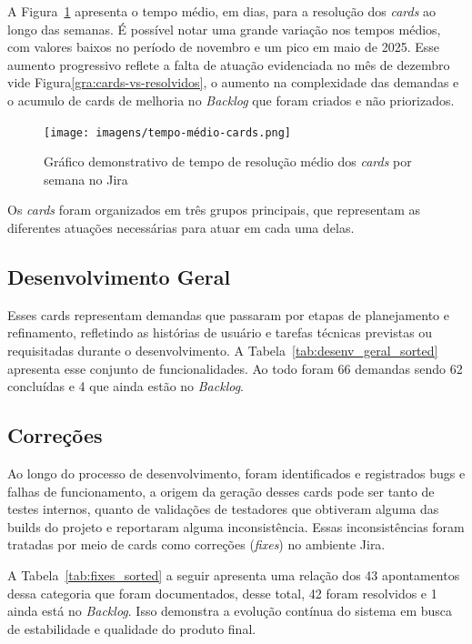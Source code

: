 A Figura~\ref{gra:tempo-medio-resolucao} apresenta o tempo médio, em dias, 
para a resolução dos \textit{cards} ao longo das semanas. É possível notar uma grande variação 
nos tempos médios, com valores baixos no período de novembro e um pico em maio de 2025. 
Esse aumento progressivo reflete a falta de atuação evidenciada no mês de dezembro vide 
Figura\ref{gra:cards-vs-resolvidos}, o aumento na complexidade das demandas e o acumulo de 
cards de melhoria no \textit{Backlog} que foram criados e não priorizados.

\begin{figure}[H]
    \centering
    \texttt{[image: imagens/tempo-médio-cards.png]}
    \caption{Gráfico demonstrativo de tempo de resolução médio dos \textit{cards} por semana no Jira}
    \label{gra:tempo-medio-resolucao}
\end{figure}

Os \textit{cards} foram organizados em três grupos principais, que representam as diferentes
atuações necessárias para atuar em cada uma delas.
\subsection{Desenvolvimento Geral}
Esses cards representam demandas que passaram por etapas de planejamento e refinamento, 
refletindo as histórias de usuário e tarefas técnicas previstas ou requisitadas durante o desenvolvimento.
A Tabela~\ref{tab:desenv_geral_sorted} apresenta esse conjunto de funcionalidades. Ao todo foram 66 demandas
sendo 62 concluídas e 4 que ainda estão no \textit{Backlog}.



\subsection{Correções}
Ao longo do processo de desenvolvimento, foram identificados e registrados bugs e falhas 
de funcionamento, a origem da geração desses cards pode ser tanto de testes internos, quanto de 
validações de testadores que obtiveram alguma das builds do projeto e reportaram alguma inconsistência. 
Essas inconsistências foram tratadas por meio de cards como correções (\textit{fixes}) no ambiente Jira.

A Tabela~\ref{tab:fixes_sorted} a seguir apresenta uma relação dos 43 apontamentos dessa categoria que foram documentados, desse total, 
42 foram resolvidos e 1 ainda está no \textit{Backlog}. Isso demonstra a evolução contínua do 
sistema em busca de estabilidade e qualidade do produto final.

